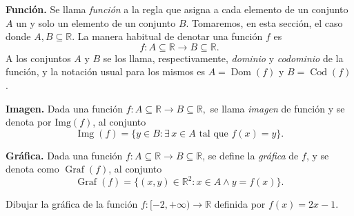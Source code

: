 
\begin{definition}\label{def:FuncMate1}{\textbf{Función.}}  Se llama \textit{función} a la regla que asigna a cada elemento de un conjunto $A$ un y solo un elemento de un conjunto $B$. Tomaremos, en esta sección, el caso donde $A, B \subseteq \mathbb{R}$.  La manera habitual de denotar una función $f$ es 
\[
f \colon A \subseteq \mathbb{R} \to B \subseteq \mathbb{R}.
\]
A los conjuntos $A$ y $B$ se los llama, respectivamente, \textit{dominio} y \textit{codominio} de la función, y la notación usual para los mismos es $A = \operatorname{Dom}(f)$ y $B = \operatorname{Cod}(f)$.
\end{definition}




\begin{definition} {\textbf{Imagen.}}
    Dada una funci\'on $f: A \subseteq \mathbb{R} \rightarrow B \subseteq \mathbb{R},$  se llama \textit{imagen} de  función y se denota por  $\text{Img}(f)$, 
    al conjunto 
\begin{equation*} 
\operatorname{Img}(f) = \{ y \in B \colon \exists \, x \in A \text{ tal que } f(x) = y \}. 
\end{equation*} 
\end{definition}

\begin{definition} {\textbf{Gráfica.}} 
\label{def:grafm1} 
Dada una función $f \colon A \subseteq \mathbb{R} \to B \subseteq \mathbb{R}$, se define la \textit{gráfica} de $f$, y se denota como $\operatorname{Graf}(f)$, al conjunto 
\begin{equation*} 
\operatorname{Graf}(f) = \{ (x,y) \in \mathbb{R}^{2} \colon x \in A \land y = f(x) \}. 
\end{equation*} 
\end{definition}





\begin{example} Dibujar la gr\'afica de la función $f \colon [-2,+\infty) \to \mathbb{R}$ definida por $f(x) = 2x-1$. 
 \end{example}

